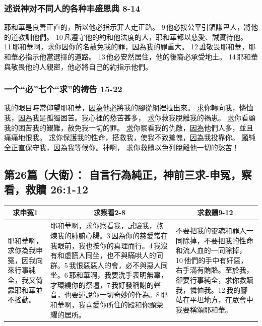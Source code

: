 \subsubsection{述说神对不同人的各种丰盛恩典 8-14}
耶和華是良善正直的，所以他必指示罪人走正路。
9 他必按公平引領謙卑人，將他的道教訓他們。
10 凡遵守他的約和他法度的人，耶和華都以慈愛、誠實待他。
11 耶和華啊，求你因你的名赦免我的罪，因為我的罪重大。
12 誰敬畏耶和華，耶和華必指示他當選擇的道路。
13 他必安然居住，他的後裔必承受地土。
14 耶和華與敬畏他的人親密，他必將自己的約指示他們。

\subsubsection{一个“必”七个“求”的祷告 15-22}
我的眼目時常仰望耶和華，\underline{因為}他\underline{必}將我的腳從網裡拉出來。
\underline{求}你轉向我，憐恤我，\underline{因為}我是孤獨困苦。我心裡的愁苦甚多，
\underline{求}你救我脫離我的禍患。
\underline{求}你看顧我的困苦我的艱難，赦免我一切的罪。
\underline{求}你察看我的仇敵，\underline{因為}他們人多，並且痛痛地恨我。
\underline{求}你保護我的性命，搭救我，使我不致羞愧，\underline{因為}我投靠你。
\underline{願}純全正直保守我，\underline{因為}我等候你。神啊，
\underline{求}你救贖以色列脫離他一切的愁苦！



\subsection{第26篇（大衛）： 自言行為純正，神前三求-申冤，察看，救贖 26:1-12}
\begin{table}[H]
\centering
\begin{tabular}{p{}|p{}|p{5.7500cm}}\hline\hline
\multicolumn{1}{c|}{求申冤1}&\multicolumn{1}{c}{求察看2-8}&\multicolumn{1}{c}{求救贖9-12}\\\hline
耶和華啊，求你為我申冤，因我向來行事純全，我又倚靠耶和華並不搖動。
&耶和華啊，求你察看我，試驗我，熬煉我的肺腑心腸。3 因為你的慈愛常在我眼前，我也按你的真理而行。4 我沒有和虛謊人同坐，也不與瞞哄人的同群。5 我恨惡惡人的會，必不與惡人同坐。6 耶和華啊，我要洗手表明無辜，才環繞你的祭壇，7 我好發稱謝的聲音，也要述說你一切奇妙的作為。8 耶和華啊，我喜愛你所住的殿和你顯榮耀的居所。
&不要把我的靈魂和罪人一同除掉，不要把我的性命和流人血的一同除掉，10 他們的手中有奸惡，右手滿有賄賂。至於我，卻要行事純全，求你救贖我，憐恤我。12 我的腳站在平坦地方，在眾會中我要稱頌耶和華。\\\hline
\end{tabular}
\end{table} 


